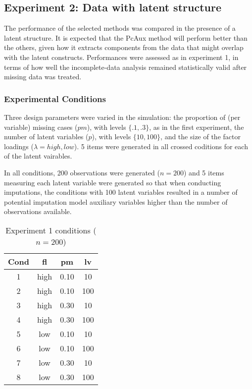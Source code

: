 \maketitle
\subsection{Experiment 2: Data with latent structure}

The performance of the selected methods was compared in the presence of a latent structure. It is expected 
that the PcAux method will perform better than the others, given how it extracts components from the data 
that might overlap with the latent constructs. Performances were assessed as in experiment 1, in terms of 
how well the incomplete-data analysis remained statistically valid after missing data was treated. 

\subsubsection{Experimental Conditions}

Three design parameters were varied in the simulation: the proportion of (per variable) missing cases ($pm$),
with levels $\{.1, .3\}$, as in the first experiment, the number of latent variables ($p$), with levels $\{10, 
100\}$, and the size of the factor loadings ($\lambda = {high, low}$). 5 items were generated in all crossed
coditions for each of the latent vairables.

In all conditions, 200 observations were generated ($n = 200$) and 5 items measuring each latent variable 
were generated so that when conducting imputations, the conditions with 100 latent variables resulted 
in a number of potential imputation model auxiliary variables higher than the number of observations
available.

\begin{table}[h]
	\centering
	\caption{Experiment 1 conditions ($n = 200$)}
	\break
	\begin{tabular}{ c c c c }
		Cond & fl & pm & lv \\ 
		\hline
		1 & high & 0.10 & 10 \\ 
		2 & high & 0.10 & 100 \\ 
		3 & high & 0.30 & 10 \\ 
		4 & high & 0.30 & 100 \\ 
		5 & low & 0.10 & 10 \\ 
		6 & low & 0.10 & 100 \\ 
		7 & low & 0.30 & 10 \\ 
		8 & low & 0.30 & 100 \\
		\hline
	\end{tabular}
	\label{table:exp1_conds}
\end{table}

